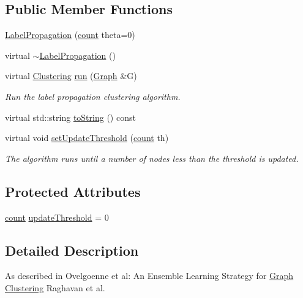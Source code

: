 \subsection*{Public Member Functions}
\begin{DoxyCompactItemize}
\item 
\hyperlink{class_networ_kit_1_1_label_propagation_a4a9267898177f7470717dca8d93de685}{Label\-Propagation} (\hyperlink{namespace_networ_kit_ad4c536a5339a8bf2f91f418b9a67a7d8}{count} theta=0)
\item 
virtual \hyperlink{class_networ_kit_1_1_label_propagation_a0c0d1e07f66033a77000b4454bcfeea0}{$\sim$\-Label\-Propagation} ()
\item 
virtual \hyperlink{class_networ_kit_1_1_clustering}{Clustering} \hyperlink{class_networ_kit_1_1_label_propagation_ae944bf5e3bb44ce6b76a70f6071c3b31}{run} (\hyperlink{class_networ_kit_1_1_graph}{Graph} \&G)
\begin{DoxyCompactList}\small\item\em Run the label propagation clustering algorithm. \end{DoxyCompactList}\item 
virtual std\-::string \hyperlink{class_networ_kit_1_1_label_propagation_a3e90c309b7463ebe1934ef2560bae6ba}{to\-String} () const 
\item 
virtual void \hyperlink{class_networ_kit_1_1_label_propagation_a1525c6b6610b9183c127edb318ebf552}{set\-Update\-Threshold} (\hyperlink{namespace_networ_kit_ad4c536a5339a8bf2f91f418b9a67a7d8}{count} th)
\begin{DoxyCompactList}\small\item\em The algorithm runs until a number of nodes less than the threshold is updated. \end{DoxyCompactList}\end{DoxyCompactItemize}
\subsection*{Protected Attributes}
\begin{DoxyCompactItemize}
\item 
\hyperlink{namespace_networ_kit_ad4c536a5339a8bf2f91f418b9a67a7d8}{count} \hyperlink{class_networ_kit_1_1_label_propagation_a017f935395202a754b9baeb83755ddf5}{update\-Threshold} = 0
\end{DoxyCompactItemize}


\subsection{Detailed Description}
As described in Ovelgoenne et al\-: An Ensemble Learning Strategy for \hyperlink{class_networ_kit_1_1_graph}{Graph} \hyperlink{class_networ_kit_1_1_clustering}{Clustering} Raghavan et al. 

